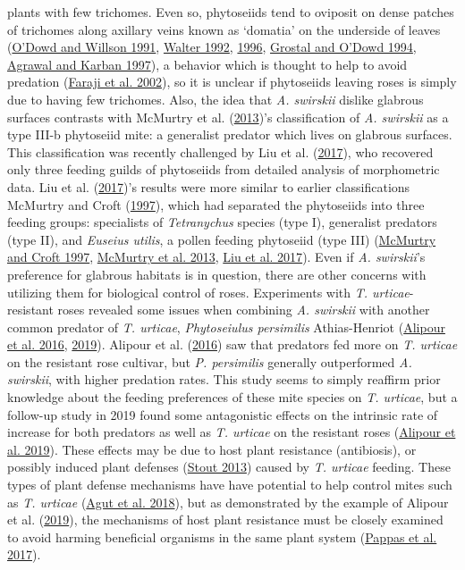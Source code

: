 \documentclass{ufdissertation}[overrideChapters] %
\begin{document}
{plants with few trichomes. Even so, phytoseiids tend to oviposit on dense patches of trichomes along axillary veins known as `domatia' on the underside of leaves (\protect\hyperlink{ref-ODowd1991}{O'Dowd and Willson 1991}, \protect\hyperlink{ref-Walter1992}{Walter 1992}, \protect\hyperlink{ref-Walter1996}{1996}, \protect\hyperlink{ref-Grostal1994}{Grostal and O'Dowd 1994}, \protect\hyperlink{ref-Agrawal1997}{Agrawal and Karban 1997}), a behavior which is thought to help to avoid predation (\protect\hyperlink{ref-Faraji2002}{Faraji et al. 2002}), so it is unclear if phytoseiids leaving roses is simply due to having few trichomes. Also, the idea that \emph{A. swirskii} dislike glabrous surfaces contrasts with McMurtry et al. (\protect\hyperlink{ref-McMurtry2013}{2013})'s classification of \emph{A. swirskii} as a type III-b phytoseiid mite: a generalist predator which lives on glabrous surfaces. This classification was recently challenged by Liu et al. (\protect\hyperlink{ref-Liu2017}{2017}), who recovered only three feeding guilds of phytoseiids from detailed analysis of morphometric data. Liu et al. (\protect\hyperlink{ref-Liu2017}{2017})'s results were more similar to earlier classifications McMurtry and Croft (\protect\hyperlink{ref-McMurtry1997}{1997}), which had separated the phytoseiids into three feeding groups: specialists of \emph{Tetranychus} species (type I), generalist predators (type II), and \emph{Euseius utilis}, a pollen feeding phytoseiid (type III) (\protect\hyperlink{ref-McMurtry1997}{McMurtry and Croft 1997}, \protect\hyperlink{ref-McMurtry2013}{McMurtry et al. 2013}, \protect\hyperlink{ref-Liu2017}{Liu et al. 2017}). Even if \emph{A. swirskii}'s preference for glabrous habitats is in question, there are other concerns with utilizing them for biological control of roses. Experiments with \emph{T. urticae}-resistant roses revealed some issues when combining \emph{A. swirskii} with another common predator of \emph{T. urticae}, \emph{Phytoseiulus persimilis} Athias-Henriot (\protect\hyperlink{ref-Alipour2016}{Alipour et al. 2016}, \protect\hyperlink{ref-Alipour2019}{2019}). Alipour et al. (\protect\hyperlink{ref-Alipour2016}{2016}) saw that predators fed more on \emph{T. urticae} on the resistant rose cultivar, but \emph{P. persimilis} generally outperformed \emph{A. swirskii}, with higher predation rates. This study seems to simply reaffirm prior knowledge about the feeding preferences of these mite species on \emph{T. urticae}, but a follow-up study in 2019 found some antagonistic effects on the intrinsic rate of increase for both predators as well as \emph{T. urticae} on the resistant roses (\protect\hyperlink{ref-Alipour2019}{Alipour et al. 2019}). These effects may be due to host plant resistance (antibiosis), or possibly induced plant defenses (\protect\hyperlink{ref-Stout2013}{Stout 2013}) caused by \emph{T. urticae} feeding. These types of plant defense mechanisms have have potential to help control mites such as \emph{T. urticae} (\protect\hyperlink{ref-Agut2018}{Agut et al. 2018}), but as demonstrated by the example of Alipour et al. (\protect\hyperlink{ref-Alipour2019}{2019}), the mechanisms of host plant resistance must be closely examined to avoid harming beneficial organisms in the same plant system (\protect\hyperlink{ref-Pappas2017}{Pappas et al. 2017}).

}
\end{document}
